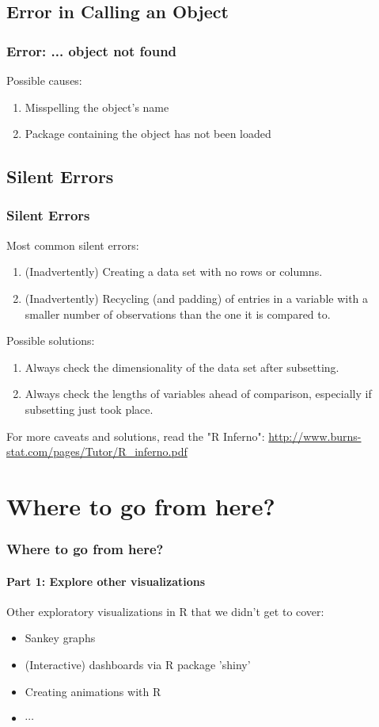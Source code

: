 \subsection{Error in Calling an Object}
\begin{frame}[fragile]
  \frametitle{\ttfamily Error: ... object not found \normalfont}
Possible causes:
  \begin{enumerate}
    \item Misspelling the object's name
    \item Package containing the object has not been loaded
  \end{enumerate}
  
\end{frame}

\subsection{Silent Errors}
\begin{frame}[fragile]
  \frametitle{Silent Errors}
Most common silent errors:
  \begin{enumerate}
    \item (Inadvertently) Creating a data set with no rows or columns. 
    \item (Inadvertently) Recycling (and padding) of entries in a variable with a smaller number of observations than the one it is compared to.  
  \end{enumerate}
Possible solutions:
  \begin{enumerate}
    \item Always check the dimensionality of the data set after subsetting.
    \item Always check the lengths of variables ahead of comparison, especially if subsetting just took place.
  \end{enumerate}   
\noindent For more caveats and solutions, read the "R Inferno": \url{http://www.burns-stat.com/pages/Tutor/R_inferno.pdf}
  
\end{frame}

\section[Next Steps]{Where to go from here?}
\begin{frame}
  \frametitle{Where to go from here?}
  \framesubtitle{Part 1: Explore other visualizations}

  Other exploratory visualizations in R that we didn't get to cover:
  \begin{itemize}
    \item Sankey graphs
    \item (Interactive) dashboards via R package 'shiny'   
    \item Creating animations with R
    \item $\cdots$
  \end{itemize}
\end{frame}


